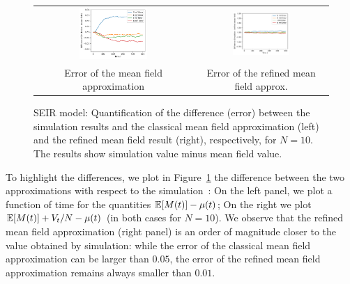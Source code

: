 \documentclass{amsart}
\begin{document}
\begin{figure}[ht]
  \begin{center}
    \begin{tabular}{cc}
      \includegraphics[width=0.45\textwidth]{SEIR_errorMF_N10_large} 
      &\includegraphics[width=0.45\textwidth]{SEIR_errorRMF_N10_large}\\
      Error of the mean field approximation
      &
      Error of the refined mean field approx.
    \end{tabular}
\end{center}
\caption{\label{fig:diff} SEIR model: Quantification of the
  difference (error) between the simulation results and the classical
  mean field approximation (left) and the refined mean field result
  (right), respectively, for $N=10$. The results show simulation value
  minus mean field value.}
\end{figure}


To highlight the differences, we plot in Figure~\ref{fig:diff} the
difference between the two approximations with respect to the
simulation~: On the left panel, we plot a function of time for the
quantities $\esp{M(t)}-\mu(t)$; On the right we plot
$\esp{M(t)}+V_t/N-\mu(t)$ (in both cases for $N=10$). We observe that
the refined mean field approximation (right panel) is an order of
magnitude closer to the value obtained by simulation: while the error
of the classical mean field approximation can be larger than $0.05$,
the error of the refined mean field approximation remains always
smaller than $0.01$. 
\end{document}
